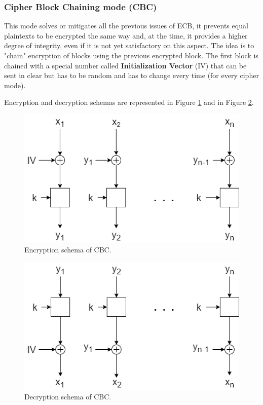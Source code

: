 \documentclass[a4paper, 12pt]{report}
\begin{document}
\subsubsection{Cipher Block Chaining mode (CBC)}
This mode solves or mitigates all the previous issues of ECB, it prevents equal plaintexts to be encrypted the same way and, at the time, it provides a higher degree of integrity, even if it is not yet satisfactory on this aspect. The idea is to "chain" encryption of blocks using the previous encrypted block. The first block is chained with a special number called \textbf{Initialization Vector} (IV) that can be sent in clear but has to be random and has to change every time (for every cipher mode).

Encryption and decryption schemas are represented in Figure \ref{fig:encCBC} and in Figure \ref{fig:decCBC}.
\begin{figure}[H]
	\centering
	\includegraphics[scale=0.55]{images/Lec9/encCBC.png}
	\caption{Encryption schema of CBC.}
	\label{fig:encCBC}
\end{figure}

\begin{figure}[H]
	\centering
	\includegraphics[scale=0.55]{images/Lec9/decCBC.png}
	\caption{Decryption schema of CBC.}
	\label{fig:decCBC}
\end{figure}
\end{document}
